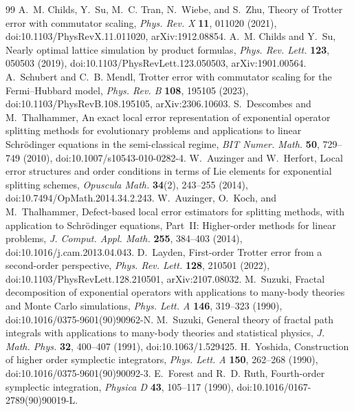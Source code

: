 \documentclass[11pt]{article}
\theoremstyle{plain}
\theoremstyle{definition}
\theoremstyle{remark}
\begin{document}
\begin{thebibliography}{99}
\small
{} A.~M. Childs, Y.~Su, M.~C. Tran, N.~Wiebe, and S.~Zhu, Theory of Trotter error with commutator scaling, \emph{Phys. Rev. X} \textbf{11}, 011020 (2021), doi:10.1103/PhysRevX.11.011020, arXiv:1912.08854.
 A.~M. Childs and Y.~Su, Nearly optimal lattice simulation by product formulas, \emph{Phys. Rev. Lett.} \textbf{123}, 050503 (2019), doi:10.1103/PhysRevLett.123.050503, arXiv:1901.00564.
 A.~Schubert and C.~B. Mendl, Trotter error with commutator scaling for the Fermi--Hubbard model, \emph{Phys. Rev. B} \textbf{108}, 195105 (2023), doi:10.1103/PhysRevB.108.195105, arXiv:2306.10603.
 S.~Descombes and M.~Thalhammer, An exact local error representation of exponential operator splitting methods for evolutionary problems and applications to linear Schr\"odinger equations in the semi-classical regime, \emph{BIT Numer. Math.} \textbf{50}, 729--749 (2010), doi:10.1007/s10543-010-0282-4.
 W.~Auzinger and W.~Herfort, Local error structures and order conditions in terms of Lie elements for exponential splitting schemes, \emph{Opuscula Math.} \textbf{34}(2), 243--255 (2014), doi:10.7494/OpMath.2014.34.2.243.
 W.~Auzinger, O.~Koch, and M.~Thalhammer, Defect-based local error estimators for splitting methods, with application to Schr\"odinger equations, Part~II: Higher-order methods for linear problems, \emph{J. Comput. Appl. Math.} \textbf{255}, 384--403 (2014), doi:10.1016/j.cam.2013.04.043.
 D.~Layden, First-order Trotter error from a second-order perspective, \emph{Phys. Rev. Lett.} \textbf{128}, 210501 (2022), doi:10.1103/PhysRevLett.128.210501, arXiv:2107.08032.
 M.~Suzuki, Fractal decomposition of exponential operators with applications to many-body theories and Monte Carlo simulations, \emph{Phys. Lett. A} \textbf{146}, 319--323 (1990), doi:10.1016/0375-9601(90)90962-N.
 M.~Suzuki, General theory of fractal path integrals with applications to many-body theories and statistical physics, \emph{J. Math. Phys.} \textbf{32}, 400--407 (1991), doi:10.1063/1.529425.
 H.~Yoshida, Construction of higher order symplectic integrators, \emph{Phys. Lett. A} \textbf{150}, 262--268 (1990), doi:10.1016/0375-9601(90)90092-3.
 E.~Forest and R.~D. Ruth, Fourth-order symplectic integration, \emph{Physica D} \textbf{43}, 105--117 (1990), doi:10.1016/0167-2789(90)90019-L.

\end{thebibliography}
\end{document}
